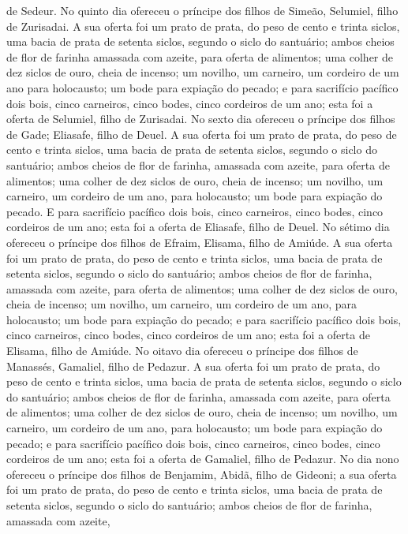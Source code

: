 de Sedeur. No quinto dia ofereceu o príncipe dos filhos de
Simeão, Selumiel, filho de Zurisadai. A sua oferta foi um
prato de prata, do peso de cento e trinta siclos, uma bacia de prata
de setenta siclos, segundo o siclo do santuário; ambos cheios de
flor de farinha amassada com azeite, para oferta de alimentos;
uma colher de dez siclos de ouro, cheia de incenso; um
novilho, um carneiro, um cordeiro de um ano para holocausto;
um bode para expiação do pecado; e para sacrifício
pacífico dois bois, cinco carneiros, cinco bodes, cinco cordeiros de
um ano; esta foi a oferta de Selumiel, filho de Zurisadai. No
sexto dia ofereceu o príncipe dos filhos de Gade; Eliasafe, filho de
Deuel. A sua oferta foi um prato de prata, do peso de cento e
trinta siclos, uma bacia de prata de setenta siclos, segundo o siclo
do santuário; ambos cheios de flor de farinha, amassada com azeite,
para oferta de alimentos; uma colher de dez siclos de ouro,
cheia de incenso; um novilho, um carneiro, um cordeiro de um
ano, para holocausto; um bode para expiação do pecado.
E para sacrifício pacífico dois bois, cinco carneiros, cinco
bodes, cinco cordeiros de um ano; esta foi a oferta de Eliasafe,
filho de Deuel. No sétimo dia ofereceu o príncipe dos filhos
de Efraim, Elisama, filho de Amiúde. A sua oferta foi um
prato de prata, do peso de cento e trinta siclos, uma bacia de prata
de setenta siclos, segundo o siclo do santuário; ambos cheios de
flor de farinha, amassada com azeite, para oferta de alimentos;
uma colher de dez siclos de ouro, cheia de incenso; um
novilho, um carneiro, um cordeiro de um ano, para holocausto;
um bode para expiação do pecado; e para sacrifício
pacífico dois bois, cinco carneiros, cinco bodes, cinco cordeiros de
um ano; esta foi a oferta de Elisama, filho de Amiúde. No
oitavo dia ofereceu o príncipe dos filhos de Manassés, Gamaliel,
filho de Pedazur. A sua oferta foi um prato de prata, do peso
de cento e trinta siclos, uma bacia de prata de setenta siclos,
segundo o siclo do santuário; ambos cheios de flor de farinha,
amassada com azeite, para oferta de alimentos; uma colher de
dez siclos de ouro, cheia de incenso; um novilho, um
carneiro, um cordeiro de um ano, para holocausto; um bode
para expiação do pecado; e para sacrifício pacífico dois
bois, cinco carneiros, cinco bodes, cinco cordeiros de um ano; esta
foi a oferta de Gamaliel, filho de Pedazur. No dia nono
ofereceu o príncipe dos filhos de Benjamim, Abidã, filho de Gideoni;
a sua oferta foi um prato de prata, do peso de cento e trinta
siclos, uma bacia de prata de setenta siclos, segundo o siclo do
santuário; ambos cheios de flor de farinha, amassada com azeite,
